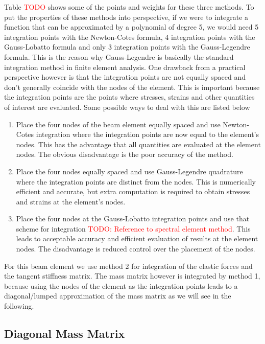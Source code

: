 Table \textcolor{red}{TODO} shows some of the points and weights for these three methods.
To put the properties of these methods into perspective, if we were to integrate a function that can be approximated by a polynomial of degree 5, we would need 5 integration points with the Newton-Cotes formula, 4 integration points with the Gauss-Lobatto formula and only 3 integration points with the Gauss-Legendre formula.
This is the reason why Gauss-Legendre is basically the standard integration method in finite element analysis.
One drawback from a practical perspective however is that the integration points are not equally spaced and don't generally coincide with the nodes of the element.
This is important because the integration points are the points where stresses, strains and other quantities of interest are evaluated.
Some possible ways to deal with this are listed below

\begin{enumerate}
\item Place the four nodes of the beam element equally spaced and use Newton-Cotes integration where the integration points are now equal to the element's nodes. This has the advantage that all quantities are evaluated at the element nodes. The obvious disadvantage is the poor accuracy of the method.
\item Place the four nodes equally spaced and use Gauss-Legendre quadrature where the integration points are distinct from the nodes. This is numerically efficient and accurate, but extra computation is required to obtain stresses and strains at the element's nodes.
\item Place the four nodes at the Gauss-Lobatto integration points and use that scheme for integration \textcolor{red}{TODO: Reference to spectral element method}. This leads to acceptable accuracy and efficient evaluation of results at the element nodes. The disadvantage is reduced control over the placement of the nodes.
\end{enumerate}

For this beam element we use method 2 for integration of the elastic forces and the tangent stiffness matrix.
The mass matrix however is integrated by method 1, because using the nodes of the element as the integration points leads to a diagonal/lumped approximation of the mass matrix as we will see in the following.

\newpage
\subsection{Diagonal Mass Matrix}

